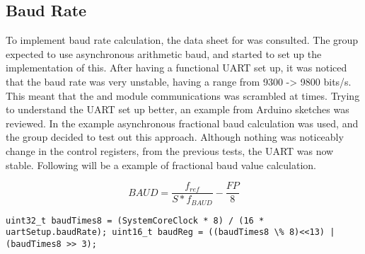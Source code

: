 \subsection{Baud Rate}
To implement baud rate calculation, the data sheet for \SAMD was consulted. The group expected to use asynchronous arithmetic baud, and started to set up the implementation of this. After having a functional UART set up, it was noticed that the baud rate was very unstable, having a range from 9300 -> 9800 bits/s. This meant that the \GPS and \SARA module communications was scrambled at times. 
Trying to understand the UART set up better, an example from Arduino sketches was reviewed. In the example asynchronous fractional baud calculation was used, and the group decided to test out this approach. Although nothing was noticeably change in the control registers, from the previous tests, the UART was now stable.
Following will be a example of fractional baud value calculation.

\[BAUD = \frac{f_{ref}}{S*f_{BAUD}} - \frac{FP}{8}\]
\begin{verbatim}	
uint32_t baudTimes8 = (SystemCoreClock * 8) / (16 * uartSetup.baudRate); uint16_t baudReg = ((baudTimes8 \% 8)<<13) | (baudTimes8 >> 3);	
\end{verbatim}

